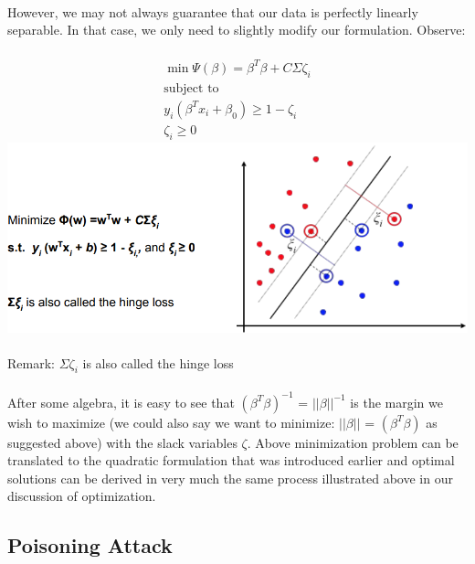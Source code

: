 \documentclass[twoside]{article}
\begin{document}
\paragraph{}
However, we may not always guarantee that our data is perfectly linearly separable. In that case, we only need to slightly modify our formulation. Observe:\\
\paragraph{}
\begin{align}
    \min\Psi(\beta) = \beta^{T}\beta + C\Sigma\zeta_{i}\\
    \text{subject to}\\
    y_{i}(\beta^{T}x_{i} + \beta_{0}) \geq 1 - \zeta_{i}\\
    \zeta_{i} \geq 0
\end{align}
\includegraphics[scale=0.5, inner]{bestmarginpic2.PNG}\\
\\
Remark: $\Sigma\zeta_{i}$ is also called the hinge loss\\
\\
After some algebra, it is easy to see that $(\beta^{T}\beta)^{-1}$ = $||\beta||^{-1}$ is the margin we wish to maximize (we could also say we want to minimize: $||\beta||$ = $(\beta^{T}\beta)$ as suggested above) with the slack variables $\zeta$. Above minimization problem can be translated to the quadratic formulation that was introduced earlier and optimal solutions can be derived in very much the same process illustrated above in our discussion of optimization.

\subsection{Poisoning Attack}
\end{document}
